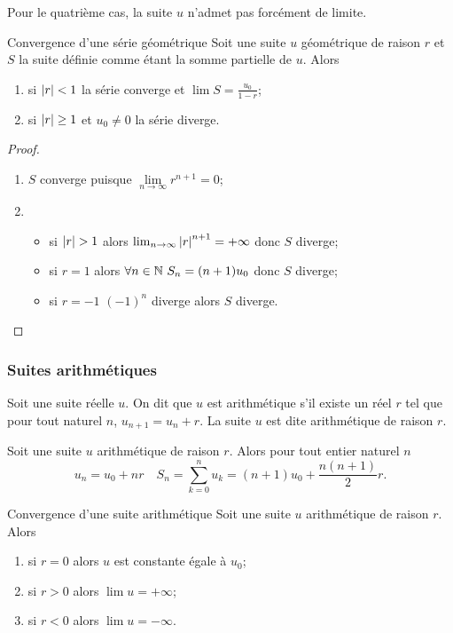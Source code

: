 Pour le quatrième cas, la suite $u$ n'admet pas forcément de limite.
\begin{prop}{Convergence d'une série géométrique}
  Soit une suite $u$ géométrique de raison $r$ et $S$ la suite définie comme étant la somme partielle de $u$. Alors
  \begin{enumerate}
  \item si $\left\lvert r\right\rvert < 1$ la série converge et $\lim S = \frac{u_0}{1-r}$;
  \item si $\left\lvert r\right\rvert \geq 1$ et $u_0 \neq 0$ la série diverge.
  \end{enumerate}
\end{prop}
\begin{proof}
  \begin{enumerate}
  \item $S$ converge puisque $\lim\limits_{n \to \infty} r^{n+1}=0$;
  \item 
    \begin{itemize} 
    \item si $\left\lvert r\right\rvert>1$ alors $\lim_{n \to \infty} \left\lvert r\right\rvert^{n+1}=+\infty$ donc $S$ diverge;
    \item si $r=1$ alors $\forall n \in \mathbb{N} \ S_n=(n+1)u_0$ donc $S$ diverge;
    \item si $r=-1$ $(-1)^n$ diverge alors $S$ diverge.
    \end{itemize}
  \end{enumerate}
\end{proof}

\subsubsection{Suites arithmétiques}

\begin{defdef}
  Soit une suite réelle $u$. On dit que $u$ est arithmétique s'il existe un réel $r$ tel que pour tout naturel $n$, $u_{n+1}=u_n +r$. La suite $u$ est dite arithmétique de raison $r$.
\end{defdef}
\begin{prop}
  Soit une suite $u$ arithmétique de raison $r$. Alors pour tout entier naturel $n$
  \begin{equation}
    u_n=u_0+nr \quad S_n=\sum_{k=0}^n u_k = (n+1)u_0 + \frac{n(n+1)}{2}r.
  \end{equation}
\end{prop}
\begin{prop}{Convergence d'une suite arithmétique}
  Soit une suite $u$ arithmétique de raison $r$. Alors
  \begin{enumerate}
  \item si $r=0$ alors $u$ est constante égale à $u_0$;
  \item si $r>0$ alors $\lim u =+\infty$;
  \item si $r<0$ alors $\lim u =-\infty$.
  \end{enumerate}
\end{prop}

